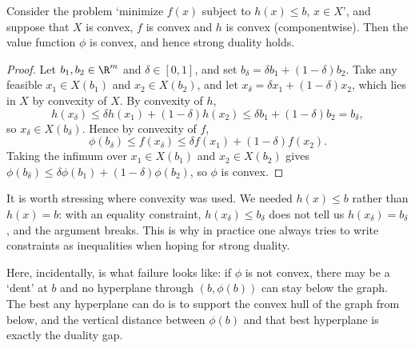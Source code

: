\documentclass[a4paper]{scrartcl}
\begin{document}
\begin{theorem}
    Consider the problem `minimize $f(x)$ subject to $h(x) \leq b$, $x \in X$', and suppose that $X$ is convex, $f$ is convex and $h$ is convex (componentwise). Then the value function $\phi$ is convex, and hence strong duality holds.
\end{theorem}
\begin{proof}
    Let $b_1, b_2 \in \R^m$ and $\delta \in [0,1]$, and set $b_\delta = \delta b_1 + (1-\delta)b_2$. Take any feasible $x_1 \in X(b_1)$ and $x_2 \in X(b_2)$, and let $x_\delta = \delta x_1 + (1 - \delta)x_2$, which lies in $X$ by convexity of $X$. By convexity of $h$,
    $$
    h(x_\delta) \leq \delta h(x_1) + (1 - \delta)h(x_2) \leq \delta b_1 + (1-\delta)b_2 = b_\delta,
    $$
    so $x_\delta \in X(b_\delta)$. Hence by convexity of $f$,
    $$
    \phi(b_\delta) \leq f(x_\delta) \leq \delta f(x_1) + (1-\delta)f(x_2).
    $$
    Taking the infimum over $x_1 \in X(b_1)$ and $x_2 \in X(b_2)$ gives $\phi(b_\delta) \leq \delta\phi(b_1) + (1-\delta)\phi(b_2)$, so $\phi$ is convex.
\end{proof}

\begin{remark}
    It is worth stressing where convexity was used. We needed $h(x) \leq b$ rather than $h(x) = b$: with an equality constraint, $h(x_\delta) \leq b_\delta$ does not tell us $h(x_\delta) = b_\delta$, and the argument breaks. This is why in practice one always tries to write constraints as inequalities when hoping for strong duality.
\end{remark}

Here, incidentally, is what failure looks like: if $\phi$ is not convex, there may be a `dent' at $b$ and no hyperplane through $(b, \phi(b))$ can stay below the graph. The best any hyperplane can do is to support the convex hull of the graph from below, and the vertical distance between $\phi(b)$ and that best hyperplane is exactly the duality gap.

\begin{center}
\end{center}
\end{document}
